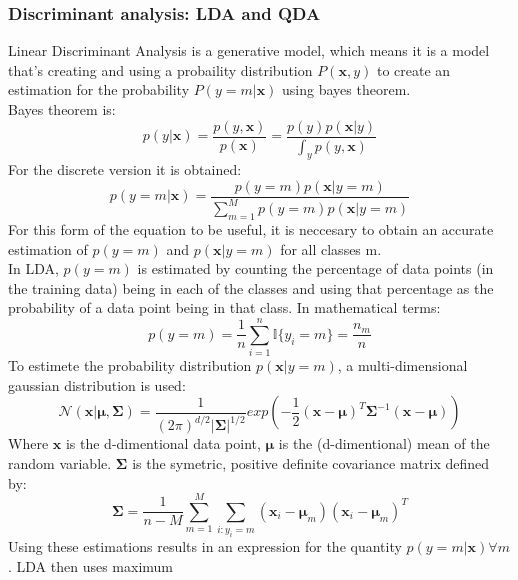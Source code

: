 \subsubsection{Discriminant analysis: LDA and QDA}

Linear Discriminant Analysis is a generative model, which means it is a model that's creating and using a probaility 
distribution $P(\mathbf{x}, y)$ to create an estimation for the probability $P(y=m|\mathbf{x})$ using bayes theorem.
\\
Bayes theorem is:
\begin{equation*}
    p(y|\mathbf{x}) = \frac{p(y,\mathbf{x})}{p(\mathbf{x})} = \frac{p(y)p(\mathbf{x}|y)}{\int_y p(y,\mathbf{x})}
\end{equation*}
For the discrete version it is obtained:
\begin{equation*}
    p(y=m|\mathbf{x}) = \frac{p(y=m)p(\mathbf{x}|y=m)}{\sum_{m=1}^{M} p(y=m) p(\mathbf{x}|y=m)}
\end{equation*}
For this form of the equation to be useful, it is neccesary to obtain an accurate estimation of $p(y=m)$ and $p(\mathbf{x}|y=m)$
for all classes m. 
\\
In LDA, $p(y=m)$ is estimated by counting the percentage of data points (in the training data) being in each of the classes 
and using that percentage as the probability of a data point being in that class. In mathematical terms:
\begin{equation*}
    p(y=m) = \frac{1}{n}\sum_{i=1}^{n}\mathbb{I}\{y_i=m\} = \frac{n_m}{n}
\end{equation*}  
To estimete the probability distribution $p(\mathbf{x}|y=m)$, a multi-dimensional gaussian distribution is used: 
\begin{equation*}
    \mathcal{N}(\mathbf{x}|\mathbf{\mu}, \mathbf{\Sigma}) = \frac{1}{(2 \pi)^{d/2} |\mathbf{\Sigma}|^{1/2}} 
    exp \left( -\frac{1}{2}(\mathbf{x}-\mathbf{\mu})^T \mathbf{\Sigma}^{-1} (\mathbf{x}-\mathbf{\mu})\right)
\end{equation*}
Where $\mathbf{x}$ is the d-dimentional data point, $\mathbf{\mu}$ is the (d-dimentional) mean of the random variable.
$\mathbf{\Sigma}$ is the symetric, positive definite covariance matrix defined by:
\begin{equation*}
    \mathbf{\Sigma} = \frac{1}{n-M}\sum_{m=1}^{M} \sum_{i:y_i=m} 
    (\mathbf{x}_i-\mathbf{\mu}_m)(\mathbf{x}_i-\mathbf{\mu}_m)^T
\end{equation*}
Using these estimations results in an expression for the quantity $p(y=m|\mathbf{x}) \forall m$. LDA then uses maximum
